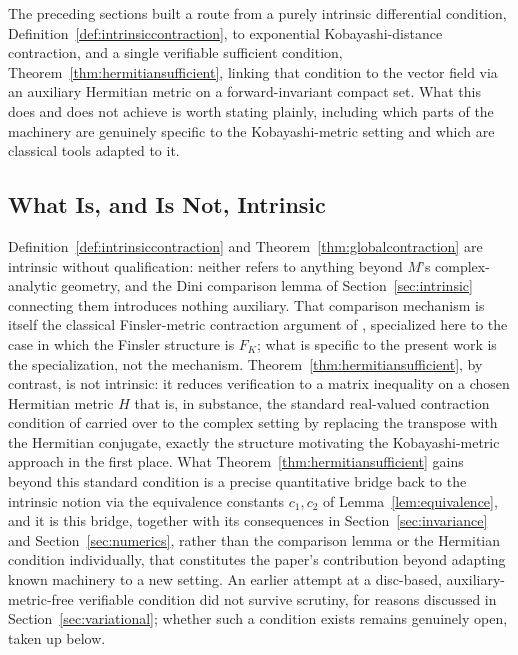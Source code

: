 \documentclass[preprint,12pt,authoryear]{elsarticle}
\begin{document}
The preceding sections built a route from a purely intrinsic differential condition, Definition~\ref{def:intrinsiccontraction}, to exponential Kobayashi-distance contraction, and a single verifiable sufficient condition, Theorem~\ref{thm:hermitiansufficient}, linking that condition to the vector field via an auxiliary Hermitian metric on a forward-invariant compact set. What this does and does not achieve is worth stating plainly, including which parts of the machinery are genuinely specific to the Kobayashi-metric setting and which are classical tools adapted to it.

\subsection{What Is, and Is Not, Intrinsic}

Definition~\ref{def:intrinsiccontraction} and Theorem~\ref{thm:globalcontraction} are intrinsic without qualification: neither refers to anything beyond $M$'s complex-analytic geometry, and the Dini comparison lemma of Section~\ref{sec:intrinsic} connecting them introduces nothing auxiliary. That comparison mechanism is itself the classical Finsler-metric contraction argument of \cite{forni2014differential}, specialized here to the case in which the Finsler structure is $F_K$; what is specific to the present work is the specialization, not the mechanism. Theorem~\ref{thm:hermitiansufficient}, by contrast, is not intrinsic: it reduces verification to a matrix inequality on a chosen Hermitian metric $H$ that is, in substance, the standard real-valued contraction condition of \cite{lohmiller1998contraction} carried over to the complex setting by replacing the transpose with the Hermitian conjugate, exactly the structure motivating the Kobayashi-metric approach in the first place. What Theorem~\ref{thm:hermitiansufficient} gains beyond this standard condition is a precise quantitative bridge back to the intrinsic notion via the equivalence constants $c_1,c_2$ of Lemma~\ref{lem:equivalence}, and it is this bridge, together with its consequences in Section~\ref{sec:invariance} and Section~\ref{sec:numerics}, rather than the comparison lemma or the Hermitian condition individually, that constitutes the paper's contribution beyond adapting known machinery to a new setting. An earlier attempt at a disc-based, auxiliary-metric-free verifiable condition did not survive scrutiny, for reasons discussed in Section~\ref{sec:variational}; whether such a condition exists remains genuinely open, taken up below.
\end{document}
